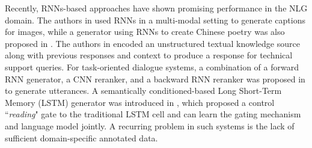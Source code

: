 \documentclass{llncs}
\begin{document}
Recently, RNNs-based approaches have shown promising performance in the NLG domain. The authors in \cite{karpathy2015deep,vinyals2015show} used RNNs in a multi-modal setting to generate captions for images, while a generator using RNNs to create Chinese poetry was also proposed in \cite{zhang2014chinese}. The authors in \cite{lowe2015incorporating} encoded an unstructured textual knowledge source along with previous responses and context to produce a response for technical support queries.
For task-oriented dialogue systems, a combination of a forward RNN generator, a CNN reranker, and a backward RNN reranker was proposed in \cite{thwsjy15} to generate utterances. A semantically conditioned-based Long Short-Term Memory (LSTM) generator was introduced in \cite{wensclstm15}, which proposed a control ``\textit{reading}" gate to the traditional LSTM cell and can learn the gating mechanism and language model jointly. A recurring problem in such systems is the lack of sufficient domain-specific annotated data. 
\end{document}
